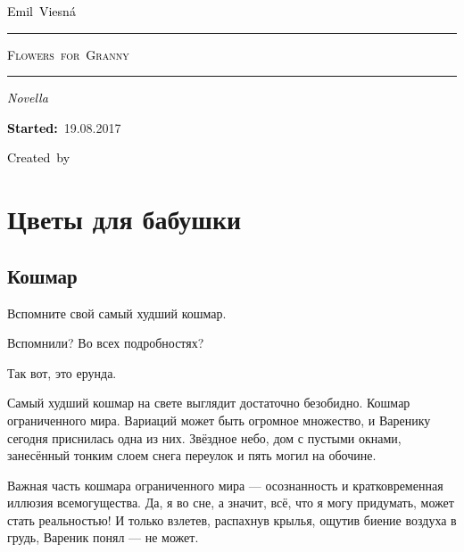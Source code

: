 \documentclass[a4paper,10pt,fleqn]{book}\usepackage{polyglossia}\setdefaultlanguage{english}\setotherlanguage{russian}\defaultfontfeatures{Ligatures=TeX,Mapping=tex-text} \usepackage{xcolor}\definecolor{lightgray}{HTML}{bbbbbb}\color{lightgray}\newcommand{\ml}[3]{\textcolor{black}{#3}}
\newcommand{\tofaauthor}{\ml{$0$}{Эмиль~Весна}{Emil~Viesn\'{a}}}
\newcommand{\tofatitle}{\ml{$0$}{ЦВЕТЫ~ДЛЯ~БАБУШКИ}{Flowers~for~Granny}}
\newcommand{\tofastarted}{19.08.2017}
\newcommand{\asterism}{\vspace{1em}{\centering\Large\bfseries$\ast~\ast~\ast$\par}\vspace{1em}}
\begin{document}
 

\begin{titlepage}
{\centering{~\par}\vspace{0.25\textheight}
{\LARGE\tofaauthor}\par
\vspace{1.0cm}\rule{17em}{1pt}\par\vspace{0.3cm}
{\Huge\textsc{\tofatitle}\par}
\vspace{0.3cm}\rule{17em}{2pt}\par\vspace{1.0cm}
{\Large\textit{\ml{$0$}{Повесть}{Novella}}\par}
\vspace{0.5cm}\asterism\par\vspace{1.0cm}
{\textbf{\ml{$0$}{Начато:}{Started:}}~\tofastarted\par}\vfill
{\Large\ml{$0$}{Создано~в}{Created~by}~\XeLaTeX}\par}
\end{titlepage}

\tableofcontents

\chapter{Цветы для бабушки}

\section{Кошмар}

Вспомните свой самый худший кошмар.

Вспомнили?
Во всех подробностях?

Так вот, это ерунда.

Самый худший кошмар на свете выглядит достаточно безобидно.
Кошмар ограниченного мира.
Вариаций может быть огромное множество, и Варенику сегодня приснилась одна из них.
Звёздное небо, дом с пустыми окнами, занесённый тонким слоем снега переулок и пять могил на обочине.

Важная часть кошмара ограниченного мира --- осознанность и кратковременная иллюзия всемогущества.
Да, я во сне, а значит, всё, что я могу придумать, может стать реальностью!
И только взлетев, распахнув крылья, ощутив биение воздуха в грудь, Вареник понял --- не может.
\end{document}
